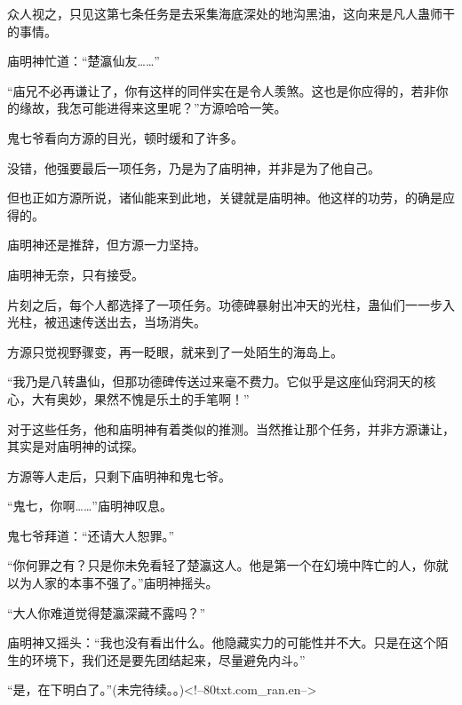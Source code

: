 \begin{this_body}
众人视之，只见这第七条任务是去采集海底深处的地沟黑油，这向来是凡人蛊师干的事情。

庙明神忙道：“楚瀛仙友……”

“庙兄不必再谦让了，你有这样的同伴实在是令人羡煞。这也是你应得的，若非你的缘故，我怎可能进得来这里呢？”方源哈哈一笑。

鬼七爷看向方源的目光，顿时缓和了许多。

没错，他强要最后一项任务，乃是为了庙明神，并非是为了他自己。

但也正如方源所说，诸仙能来到此地，关键就是庙明神。他这样的功劳，的确是应得的。

庙明神还是推辞，但方源一力坚持。

庙明神无奈，只有接受。

片刻之后，每个人都选择了一项任务。功德碑暴射出冲天的光柱，蛊仙们一一步入光柱，被迅速传送出去，当场消失。

方源只觉视野骤变，再一眨眼，就来到了一处陌生的海岛上。

“我乃是八转蛊仙，但那功德碑传送过来毫不费力。它似乎是这座仙窍洞天的核心，大有奥妙，果然不愧是乐土的手笔啊！”

对于这些任务，他和庙明神有着类似的推测。当然推让那个任务，并非方源谦让，其实是对庙明神的试探。

方源等人走后，只剩下庙明神和鬼七爷。

“鬼七，你啊……”庙明神叹息。

鬼七爷拜道：“还请大人恕罪。”

“你何罪之有？只是你未免看轻了楚瀛这人。他是第一个在幻境中阵亡的人，你就以为人家的本事不强了。”庙明神摇头。

“大人你难道觉得楚瀛深藏不露吗？”

庙明神又摇头：“我也没有看出什么。他隐藏实力的可能性并不大。只是在这个陌生的环境下，我们还是要先团结起来，尽量避免内斗。”

“是，在下明白了。”(未完待续。。)<!--80txt.com\_ran.en-->

\end{this_body}


